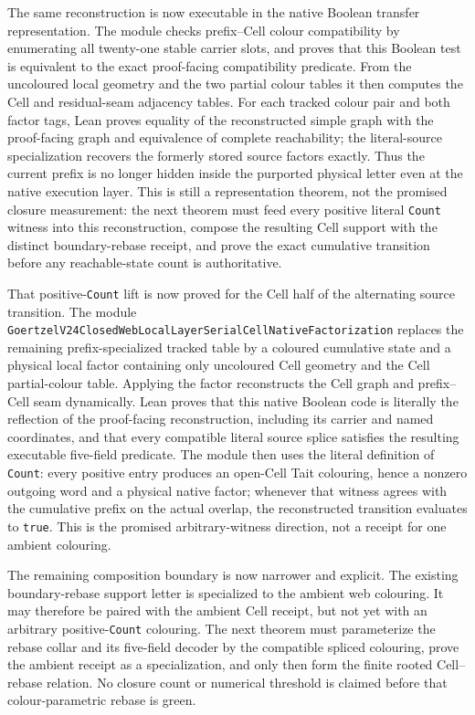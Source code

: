 \documentclass[11pt]{article}
\theoremstyle{definition}
\begin{document}
The same reconstruction is now executable in the native Boolean transfer
representation.  The module
checks prefix--Cell colour compatibility by enumerating all twenty-one stable
carrier slots, and proves that this Boolean test is equivalent to the exact
proof-facing compatibility predicate.  From the uncoloured local geometry and
the two partial colour tables it then computes the Cell and residual-seam
adjacency tables.  For each tracked colour pair and both factor tags, Lean
proves equality of the reconstructed simple graph with the proof-facing graph
and equivalence of complete reachability; the literal-source specialization
recovers the formerly stored source factors exactly.  Thus the current prefix
is no longer hidden inside the purported physical letter even at the native
execution layer.  This is still a representation theorem, not the promised
closure measurement: the next theorem must feed every positive literal
\texttt{Count} witness into this reconstruction, compose the resulting Cell
support with the distinct boundary-rebase receipt, and prove the exact
cumulative transition before any reachable-state count is authoritative.

That positive-\texttt{Count} lift is now proved for the Cell half of the
alternating source transition.  The module
\texttt{GoertzelV24ClosedWebLocalLayerSerialCellNativeFactorization} replaces
the remaining prefix-specialized tracked table by a coloured cumulative state
and a physical local factor containing only uncoloured Cell geometry and the
Cell partial-colour table.  Applying the factor reconstructs the Cell graph
and prefix--Cell seam dynamically.  Lean proves that this native Boolean code
is literally the reflection of the proof-facing reconstruction, including its
carrier and named coordinates, and that every compatible literal source
splice satisfies the resulting executable five-field predicate.  The module
 then
uses the literal definition of \texttt{Count}: every positive entry produces
an open-Cell Tait colouring, hence a nonzero outgoing word and a physical
native factor; whenever that witness agrees with the cumulative prefix on the
actual overlap, the reconstructed transition evaluates to \texttt{true}.
This is the promised arbitrary-witness direction, not a receipt for one
ambient colouring.

The remaining composition boundary is now narrower and explicit.  The
existing boundary-rebase support letter is specialized to the ambient web
colouring.  It may therefore be paired with the ambient Cell receipt, but not
yet with an arbitrary positive-\texttt{Count} colouring.  The next theorem
must parameterize the rebase collar and its five-field decoder by the
compatible spliced colouring, prove the ambient receipt as a specialization,
and only then form the finite rooted Cell--rebase relation.  No closure count
or numerical threshold is claimed before that colour-parametric rebase is
green.
\end{document}
